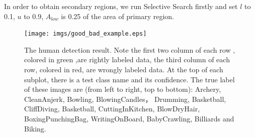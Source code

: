 \documentclass[10pt,twocolumn,letterpaper]{article}
\begin{document}
In order to obtain secondary regions, we run Selective Search firstly and set $l$ to 0.1, $u$ to 0.9, $A_{low}$ is 0.25 of the area of primary region. 
\begin{figure}
	\begin{center}
		\texttt{[image: imgs/good\_bad\_example.eps]}
		\caption{The human detection result. Note the first two column of each row , colored in green ,are rightly labeled data,  the third column of each row, colored in red, are wrongly labeled data. At the top of each subplot, there is a test class name and its confidence. The true label of these images are (from left to right, top to bottom): Archery, CleanAnjerk, Bowling, BlowingCandles， Drumming, Basketball,  CliffDiving, Basketball, CuttingInKitchen, BlowDryHair, BoxingPunchingBag, WritingOnBoard, BabyCrawling, Billiards and Biking.}
		\label{good_bad_example}
	\end{center}
\end{figure}
\end{document}
